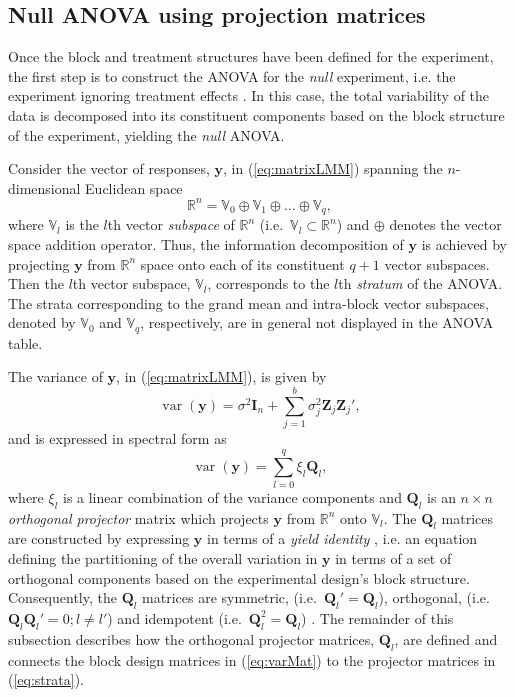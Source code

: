 \documentclass[article]{jss}
\newcommand{\I}{\mathbf{I}}
\newcommand{\Z}{\mathbf{Z}}
\newcommand{\Q}{\mathbf{Q}}
\begin{document}
\subsection{Null ANOVA using projection matrices}
\label{subsec:strataDecompProj}
Once the block and treatment structures have been defined for the experiment, the first step is to construct the ANOVA for the \emph{null} experiment, i.e. the experiment ignoring treatment effects \citep{Nelder1965A}. In this case, the total variability of the data is decomposed into its constituent components based on the block structure of the experiment, yielding the \emph{null} ANOVA.

Consider the vector of responses, $\bm{y}$, in (\ref{eq:matrixLMM}) spanning the $n$-dimensional Euclidean space
\begin{equation}
\label{eq:vecSpace}
\mathbb{R}^n = \mathbb{V}_0 \oplus \mathbb{V}_1 \oplus \dots \oplus \mathbb{V}_{q},
\end{equation} 
where $\mathbb{V}_l$ is the $l$th vector \emph{subspace} of $\mathbb{R}^n$ (i.e.\ $\mathbb{V}_l \subset \mathbb{R}^n$) and  $\oplus$ denotes the vector space addition operator. Thus, the information decomposition of $\bm{y}$ is achieved by projecting $\bm{y}$ from $\mathbb{R}^n$ space onto each of its constituent $q + 1$ vector subspaces. Then the $l$th vector subspace, $\mathbb{V}_l$, corresponds to the $l$th \emph{stratum} of the ANOVA. The strata corresponding to the grand mean and intra-block vector subspaces, denoted by $\mathbb{V}_0$ and $\mathbb{V}_{q}$, respectively, are in general not displayed in the ANOVA table. 

The variance of $\bm{y}$, in (\ref{eq:matrixLMM}), is given by
\begin{equation}
\label{eq:varMat}
\operatorname{var}(\bm{y}) = \sigma^2\I_n + \sum_{j=1}^{b} \sigma_j^2 \Z_j\Z_j',
\end{equation}
and is expressed in spectral form as 
\begin{equation}
\label{eq:strata}
\operatorname{var}(\bm{y}) = \sum_{l=0}^{q} \xi_l \Q_l,
\end{equation}
where $\xi_l$ is a linear combination of the variance components and $\Q_l$ is an $n \times n$ \emph{orthogonal projector} matrix which projects $\bm{y}$ from $\mathbb{R}^n$ onto $\mathbb{V}_l$. The $\Q_l$ matrices are constructed by expressing $\bm{y}$ in terms of a \emph{yield identity} \citep{Nelder1965A}, i.e. an equation defining the partitioning of the overall variation in $\bm{y}$ in terms of a set of orthogonal components based on the experimental design's block structure. Consequently, the $\Q_l$ matrices are symmetric, (i.e.\ $\Q_l' = \Q_l$), orthogonal, (i.e.\ $\Q_l\Q_{l}' = 0; l \neq l'$) and idempotent (i.e.\ $\Q_l^2 = \Q_l$) \citep{Hadi1996}. The remainder of this subsection describes how the orthogonal projector matrices, $\Q_l$, are defined and connects the block design matrices in (\ref{eq:varMat}) to the projector matrices in (\ref{eq:strata}).
\end{document}
